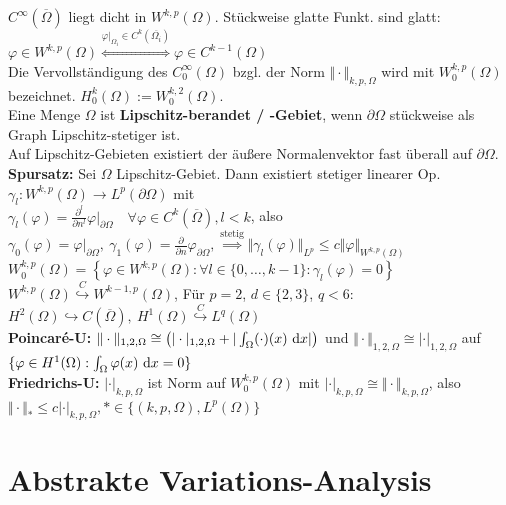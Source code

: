 \documentclass[12pt]{scrartcl}
\begin{document}
	$C^\infty(\overline{\Omega})$ liegt dicht in $W^{k,p}(\Omega)$.
	Stückweise glatte Funkt. sind glatt:
	$\varphi\in W^{k,p}(\Omega)\overset{\varphi|_{\Omega_i}\in C^k(\overline{\Omega_i})}{\Longleftrightarrow}\varphi\in C^{k-1}(\Omega)$\\
	Die Vervollständigung des $C_0^\infty(\Omega)$ bzgl. der Norm $\Vert\cdot\Vert_{k,p,\Omega}$ wird mit $W_0^{k,p}(\Omega)$ bezeichnet.
	$H_0^k(\Omega):=W_0^{k,2}(\Omega)$.\\
	Eine Menge $\Omega$ ist \textbf{Lipschitz-berandet / -Gebiet}, wenn $\partial\Omega$ stückweise als Graph Lipschitz-stetiger ist.\\
	Auf Lipschitz-Gebieten existiert der äußere Normalenvektor fast überall auf $\partial\Omega$.\\
	\textbf{Spursatz:} Sei $\Omega$ Lipschitz-Gebiet. Dann existiert stetiger linearer Op. $\gamma_l:W^{k,p}(\Omega)\rightarrow L^p(\partial\Omega)$ mit\\ 
	$\gamma_l(\varphi)=\frac{\partial^l}{\partial n^l}\varphi|_{\partial\Omega}\quad\forall\varphi\in C^k(\overline{\Omega}),l<k$, also $\gamma_0(\varphi)=\varphi|_{\partial\Omega},~\gamma_1(\varphi)=\frac{\partial}{\partial n}\varphi_{\partial\Omega},\overset{\text{stetig}}{\implies}
	\Vert\gamma_l(\varphi)\Vert_{L^p}\leq c\Vert\varphi\Vert_{W^{k,p}(\Omega)}$\\
	$W_0^{k,p}(\Omega)=\left\lbrace\varphi\in W^{k,p}(\Omega):
		\forall l\in\lbrace0,\ldots,k-1\rbrace:\gamma_l(\varphi)=0\right\rbrace$\\
	$W^{k,p}(\Omega)\stackrel{C}{\hookrightarrow} W^{k-1,p}(\Omega)$, 
	Für $p=2$, $d\in\lbrace2,3\rbrace$, $q<6$:
	$H^2(\Omega)\hookrightarrow C(\overline{\Omega}),~H^1(\Omega)\stackrel{C}{\hookrightarrow} L^q(\Omega)$\\
	\textbf{Poincaré-U:} $\Vert\cdot\Vert_{1,2,\Omega}\cong\big(|\cdot|_{1,2,\Omega}+|\int_\Omega(\cdot)(x)\text{ d} x|\big)$ und $\Vert\cdot\Vert_{1,2,\Omega}\cong|\cdot|_{1,2,\Omega}$ auf $\lbrace\varphi\in H^1(\Omega):\int_\Omega \varphi(x)\text{ d} x=0\rbrace$\\
	\textbf{Friedrichs-U:} $|\cdot|_{k,p,\Omega}$ ist Norm auf $W_0^{k,p}(\Omega)$ mit $|\cdot|_{k,p,\Omega}\cong\Vert\cdot\Vert_{k,p,\Omega}$, also $\Vert\cdot\Vert_\ast\leq c|\cdot|_{k,p,\Omega},*\in\lbrace(k,p,\Omega),L^p(\Omega)\rbrace$
	
	\section{Abstrakte Variations-Analysis}
	
\end{document}
